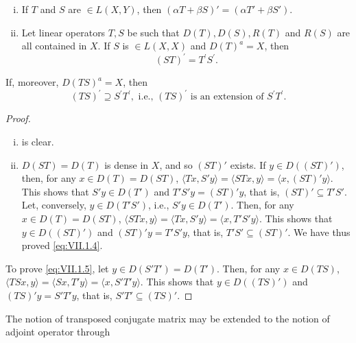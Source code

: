 \begin{theorem}\label{thm:VII.1.Theorem.3} \begin{enumerate}[i)]
\item If $T$ and $S$ are $\in L(X, Y)$, then $(\alpha T + \beta S)' = (\alpha T' + \beta S')$.
\item Let linear operators $T, S$ be such that $D(T), D(S), R(T)$ and $R(S)$ are all contained in $X$. If $S$ is $\in L(X, X)$ and $D(T)^a = X$, then 
\begin{equation}\label{eq:VII.1.4}
(S T) ^{\prime} = T ^{\prime} S ^{\prime}.
\end{equation}
\end{enumerate}
\end{theorem}

If, moreover, $D(TS)^{a} = X$, then 
\begin{equation}\label{eq:VII.1.5}
(T S) ^{\prime} \supseteq S ^{\prime} T ^{\prime}, \text{ i.e., } (T S) ^{\prime} \text{ is an extension of } S ^{\prime} T ^{\prime}.
\end{equation}

\begin{proof}
 \begin{enumerate}[i)]
\item is clear.
\item $D(ST) = D(T)$ is dense in $X$, and so $(ST)'$ exists. If $y \in D((ST)')$, then, for any $x \in D(T) = D(ST)$, $\langle Tx, S'y \rangle = \langle STx, y \rangle = \langle x, (ST)'y \rangle$. This shows that $S'y \in D(T')$ and $T'S'y = (ST)'y$, that is, $(ST)' \subseteq T'S'$. Let, conversely, $y \in D(T'S')$, i.e., $S'y \in D(T')$. Then, for any $x \in D(T) = D(ST)$, $\langle STx, y \rangle = \langle Tx, S'y \rangle = \langle x, T'S'y \rangle$. This shows that $y \in D((ST)')$ and $(ST)'y = T'S'y$, that is, $T'S' \subseteq (ST)'$. We have thus proved \eqref{eq:VII.1.4}.
\end{enumerate}



To prove \eqref{eq:VII.1.5}, let $y \in D(S'T') = D(T')$. Then, for any $x \in D(TS)$, $\langle TSx, y \rangle = \langle Sx, T'y \rangle = \langle x, S'T'y \rangle$. This shows that $y \in D((TS)')$ and $(TS)'y = S'T'y$, that is, $S'T' \subseteq (TS)'$.
\end{proof}

\label{sec:VII.2}

The notion of transposed conjugate matrix may be extended to the notion of adjoint operator through 


